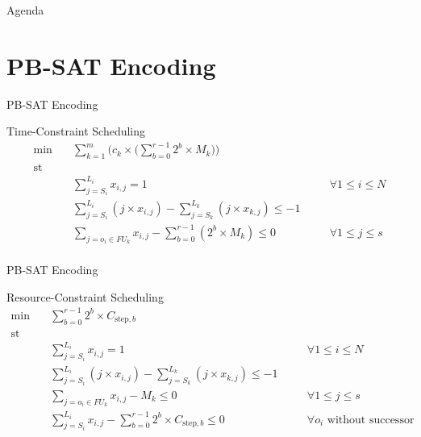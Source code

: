 \documentclass{beamer}
\DeclareMathOperator*{\st}{st}
\begin{document}
\begin{frame}{Agenda}
  \section{PB-SAT Encoding}
  \tableofcontents[currentsection]
\end{frame}

\begin{frame}[fragile]{PB-SAT Encoding}
 \begin{block}{Time-Constraint Scheduling}
  \begin{subequations}
    \begin{align}
      \min \quad & \sum_{k=1}^m \biggl(c_k \times \biggl(\sum_{b=0}^{r-1}2^b \times M_k\biggr)\biggr)\\
      \st  \quad & \\
      \quad & \sum_{j=S_i}^{L_i} x_{i,j} = 1 & \quad & \forall 1 \leq i \leq N \\\label{c:1}
      \quad & \sum_{j=S_i}^{L_i} (j \times x_{i,j}) - \sum_{j=S_k}^{L_k} (j \times x_{k,j}) \leq -1 \\\label{c:2}
      \quad & \sum_{j=o_i \in FU_k} x_{i,j} - \sum_{b=0}^{r-1}(2^b \times M_k) \leq 0 & \quad & \forall 1 \leq j \leq s\\\label{c:3}
    \end{align}
    \end{subequations}
  \end{block}
\end{frame}

\begin{frame}[fragile]{PB-SAT Encoding}
  \begin{block}{Resource-Constraint Scheduling}
   \begin{subequations}
     \begin{align}
       \min \quad & \sum_{b=0}^{r-1}2^b \times C_{\text{step},b}\\
       \st  \quad & \\
       \quad & \sum_{j=S_i}^{L_i} x_{i,j} = 1 & \quad & \forall 1 \leq i \leq N \\\label{c:4}
       \quad & \sum_{j=S_i}^{L_i} (j \times x_{i,j}) - \sum_{j=S_k}^{L_k} (j \times x_{k,j}) \leq -1 \\\label{c:5}
       \quad & \sum_{j=o_i \in FU_k} x_{i,j} - M_k \leq 0 & \quad & \forall 1 \leq j \leq s\\\label{c:6}
       \quad & \sum_{j=S_i}^{L_i} x_{i,j} - \sum_{b=0}^{r-1}2^b \times C_{\text{step},b} \leq 0 & \quad & \forall o_i \text{ without successor} \\\label{c:7}
     \end{align}
     \end{subequations}
   \end{block}
 \end{frame}
\end{document}
